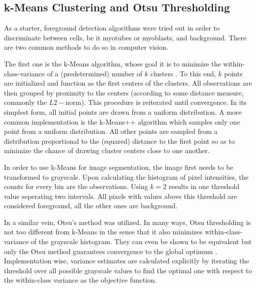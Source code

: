 \subsection{k-Means Clustering and Otsu Thresholding}
As a starter, foreground detection algorithms were tried out in order to discriminate between cells, be it myotubes or myoblasts, and background. There are two common methods to do so in computer vision. 

The first one is the k-Means algorithm, whose goal it is to minimize the within-class-variance of a (predetermined) number of $k$ clusters \cite{bishop2006}. To this end, $k$ points are initialized and function as the first centers of the clusters. All observations are then grouped by proximity to the centers (according to some distance measure, commonly the $L2-$norm). This procedure is reiterated until convergence. In its simplest form, all initial points are drawn from a uniform distribution. A more common implementation is the k-Means++ algorithm \cite{kmeans} which samples only one point from a uniform distribution. All other points are sampled from a distribution proportional to the (squared) distance to the first point so as to minimize the chance of drawing cluster centers close to one another.

In order to use k-Means for image segmentation, the image first needs to be transformed to grayscale. Upon calculating the histogram of pixel intensities, the counts for every bin are the observations. Using $k = 2$ results in one threshold value seperating two intervals. All pixels with values above this threshold are considered foreground, all the other ones are background.

In a similar vein, Otsu's method \cite{otsu} was utilized. In many ways, Otsu thresholding is not too different from k-Means in the sense that it also minimizes within-class-variance of the grayscale histogram. They can even be shown to be equivalent but only the Otsu method guarantees convergence to the global optimum \cite{liu2009otsu}. Implementation wise, variance estimates are calculated explicitly by iterating the threshold over all possible grayscale values to find the optimal one with respect to the within-class variance as the objective function.

